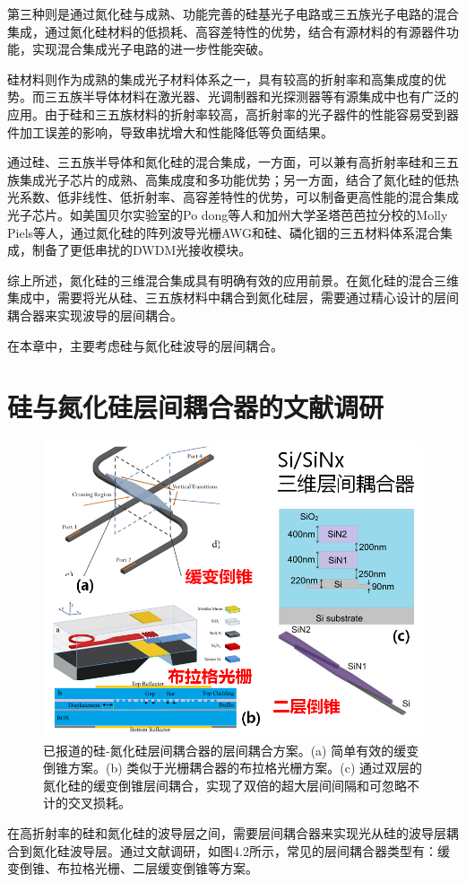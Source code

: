 第三种则是通过氮化硅与成熟、功能完善的硅基光子电路或三五族光子电路的混合集成，通过氮化硅材料的低损耗、高容差特性的优势，结合有源材料的有源器件功能，实现混合集成光子电路的进一步性能突破。 
 
硅材料则作为成熟的集成光子材料体系之一，具有较高的折射率和高集成度的优势。而三五族半导体材料在激光器、光调制器和光探测器等有源集成中也有广泛的应用。由于硅和三五族材料的折射率较高，高折射率的光子器件的性能容易受到器件加工误差的影响，导致串扰增大和性能降低等负面结果。

通过硅、三五族半导体和氮化硅的混合集成，一方面，可以兼有高折射率硅和三五族集成光子芯片的成熟、高集成度和多功能优势；另一方面，结合了氮化硅的低热光系数、低非线性、低折射率、高容差特性的优势，可以制备更高性能的混合集成光子芯片。如美国贝尔实验室的Po dong等人和加州大学圣塔芭芭拉分校的Molly Piels等人，通过氮化硅的阵列波导光栅AWG和硅、磷化铟的三五材料体系混合集成，制备了更低串扰的DWDM光接收模块。\cite{Dong2016Silicon,Bauters2014Low}

综上所述，氮化硅的三维混合集成具有明确有效的应用前景。在氮化硅的混合三维集成中，需要将光从硅、三五族材料中耦合到氮化硅层，需要通过精心设计的层间耦合器来实现波导的层间耦合。

在本章中，主要考虑硅与氮化硅波导的层间耦合。

\section{硅与氮化硅层间耦合器的文献调研}

\begin{figure}[!htbp]
    \centering
    \includegraphics[width=1\textwidth]{Img/4-2.png}
    \caption{已报道的硅-氮化硅层间耦合器的层间耦合方案。(a) 简单有效的缓变倒锥方案。(b) 类似于光栅耦合器的布拉格光栅方案。(c) 通过双层的氮化硅的缓变倒锥层间耦合，实现了双倍的超大层间间隔和可忽略不计的交叉损耗。\cite{Jones2013Ultra,Majid2014High,Sacher:17}}
    \label{fig:4-2}
\end{figure}
在高折射率的硅和氮化硅的波导层之间，需要层间耦合器来实现光从硅的波导层耦合到氮化硅波导层。通过文献调研，如图4.2所示，常见的层间耦合器类型有：缓变倒锥、布拉格光栅、二层缓变倒锥等方案。


